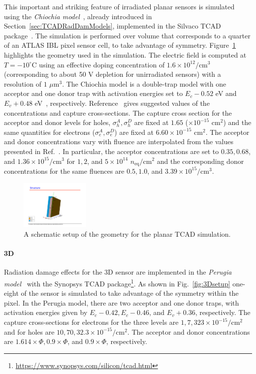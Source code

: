 This important and striking feature of irradiated planar sensors is simulated using the \textit{Chiochia model}~\cite{CHIOCHIA2006}, already introduced in Section~\ref{sec:TCADRadDamModels}, implemented in the Silvaco TCAD package~\cite{silvaco}.  The simulation is performed over volume that corresponds to a quarter of an ATLAS IBL pixel sensor cell, to take advantage of symmetry.  Figure~\ref{fig:planarsetup} highlights the geometry used in the simulation.   The electric field is computed at $T=-10^{\circ}$C using an effective doping concentration of $1.6\times 10^{12}/\text{cm}^3$ (corresponding to about 50 V depletion for unirradiated sensors) with a resolution of $1$ $\text{$\mu$m}^3$.  The Chiochia model is a double-trap model with one acceptor and one donor trap with activation energies set to $E_c-0.52$ eV and $E_v+0.48$ eV~\cite{bib:DP}, respectively.  Reference~\cite{CHIOCHIA2006} gives suggested values of the concentrations and capture cross-sections.  The capture cross section for the acceptor and donor levels for holes, $\sigma_h^A,\sigma_h^D$ are fixed at $1.65$ ($\times 10^{-15}$ cm$^2$) and the same quantities for electrons ($\sigma_e^{A},\sigma_e^D$) are fixed at $6.60\times 10^{-15}$ cm$^2$.  The acceptor and donor concentrations vary with fluence are interpolated from the values presented in Ref.~\cite{CHIOCHIA2006}.  In particular, the acceptor concentrations are set to $0.35, 0.68$, and $1.36\times 10^{15}/\text{cm$^3$}$ for $1, 2$, and $5\times 10^{14}$ $n_\text{eq}/\text{cm}^2$ and the corresponding donor concentrations for the same fluences are $0.5, 1.0$, and $3.39\times 10^{15}/\text{cm$^3$}$.

\begin{figure}[!htpb]
\centering
\includegraphics[width=0.3\textwidth]{planar.pdf}
\caption{A schematic setup of the geometry for the planar TCAD simulation.}
\label{fig:planarsetup}
\end{figure}

\paragraph{3D} Radiation damage effects for the 3D sensor are implemented in the \textit{Perugia model}~\cite{7542192} with the Synopsys TCAD package\footnote{\url{https://www.synopsys.com/silicon/tcad.html}}.  As shown in Fig.~\ref{fig:3Dsetup} one-eight of the sensor is simulated to take advantage of the symmetry within the pixel.  In the Perugia model, there are two acceptor and one donor traps, with activation energies given by $E_c-0.42, E_c-0.46$, and $E_v+0.36$, respectively.  The capture cross-sections for electrons for the three levels are $1, 7, 323\times 10^{-15}/\text{cm}^2$ and for holes are $10, 70, 32.3\times 10^{-15}/\text{cm}^2$.  The acceptor and donor concentrations are $1.614\times\Phi,0.9\times\Phi$, and $0.9\times\Phi$, respectively. 

